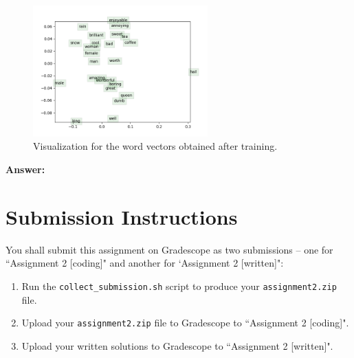 \documentclass{article}
\newenvironment{answer}{
    {\bf Answer:} \sf \begingroup\color{red}
}{\endgroup}%
\begin{document}
\begin{enumerate}[label=(\alph*)]
\begin{figure}[h]
    \centering
    \includegraphics[width=0.6\textwidth]{word_vectors.png}
    \caption{Visualization for the word vectors obtained after training.}
    \label{fig:word2vec}
\end{figure}
    
\begin{shaded}
\begin{answer}

\end{answer}
\end{shaded}

\section{Submission Instructions}
You shall submit this assignment on Gradescope as two submissions -- one for ``Assignment 2 [coding]" and another for `Assignment 2 [written]":
\begin{enumerate}
    \item Run the \texttt{collect\_submission.sh} script to produce your \texttt{assignment2.zip} file.
    \item Upload your \texttt{assignment2.zip} file to Gradescope to ``Assignment 2 [coding]".
    \item Upload your written solutions to Gradescope to ``Assignment 2 [written]".
\end{enumerate}

\end{enumerate}
\end{document}
